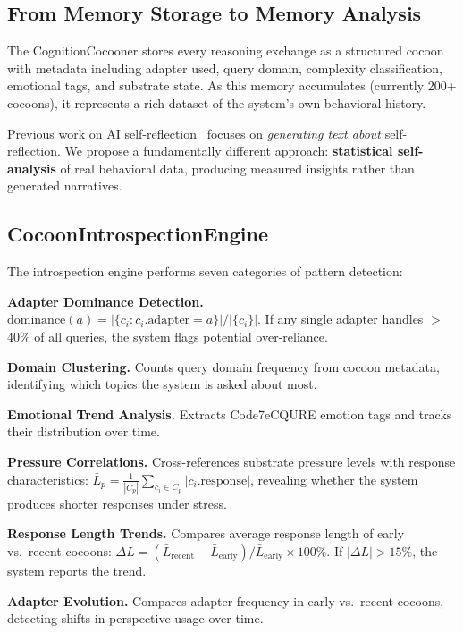 \documentclass[11pt,a4paper]{article}
\begin{document}
\subsection{From Memory Storage to Memory Analysis}

The CognitionCocooner stores every reasoning exchange as a structured cocoon
with metadata including adapter used, query domain, complexity classification,
emotional tags, and substrate state. As this memory accumulates (currently
200+ cocoons), it represents a rich dataset of the system's own behavioral
history.

Previous work on AI self-reflection~\citep{shinn2023reflexion} focuses on
\emph{generating text about} self-reflection. We propose a fundamentally
different approach: \textbf{statistical self-analysis} of real behavioral
data, producing measured insights rather than generated narratives.

\subsection{CocoonIntrospectionEngine}

The introspection engine performs seven categories of pattern detection:

\textbf{Adapter Dominance Detection.}
$\text{dominance}(a) = |\{c_i : c_i.\text{adapter} = a\}| / |\{c_i\}|$.
If any single adapter handles $>$40\% of all queries, the system flags
potential over-reliance.

\textbf{Domain Clustering.} Counts query domain frequency from cocoon metadata,
identifying which topics the system is asked about most.

\textbf{Emotional Trend Analysis.} Extracts Code7eCQURE emotion tags and
tracks their distribution over time.

\textbf{Pressure Correlations.} Cross-references substrate pressure levels
with response characteristics:
$\bar{L}_p = \frac{1}{|C_p|} \sum_{c_i \in C_p} |c_i.\text{response}|$,
revealing whether the system produces shorter responses under stress.

\textbf{Response Length Trends.} Compares average response length of early
vs.\ recent cocoons:
$\Delta L = (\bar{L}_{\text{recent}} - \bar{L}_{\text{early}}) / \bar{L}_{\text{early}} \times 100\%$.
If $|\Delta L| > 15\%$, the system reports the trend.

\textbf{Adapter Evolution.} Compares adapter frequency in early vs.\ recent
cocoons, detecting shifts in perspective usage over time.
\end{document}
